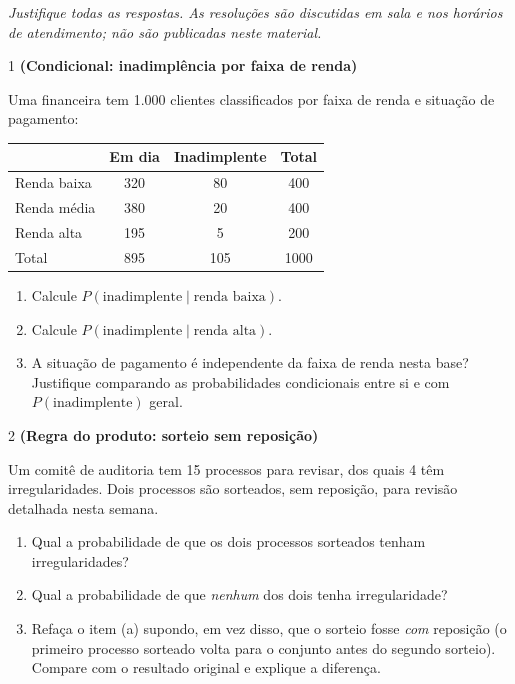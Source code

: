 \documentclass[11pt]{article}
\begin{document}

\noindent \textit{Justifique todas as respostas. As resoluções são discutidas em sala e nos horários de atendimento; não são publicadas neste material.}

\begin{questao}{1} \textbf{(Condicional: inadimplência por faixa de renda)}

Uma financeira tem 1.000 clientes classificados por faixa de renda e situação de pagamento:

\begin{center}
\begin{tabular}{l|cc|c}
\toprule
 & Em dia & Inadimplente & Total \\
\midrule
Renda baixa  & 320 & 80  & 400 \\
Renda média  & 380 & 20  & 400 \\
Renda alta   & 195 & 5   & 200 \\
\midrule
Total        & 895 & 105 & 1000\\
\bottomrule
\end{tabular}
\end{center}

\begin{enumerate}[label=(\alph*)]
  \item Calcule $P(\text{inadimplente}\mid\text{renda baixa})$.
  \item Calcule $P(\text{inadimplente}\mid\text{renda alta})$.
  \item A situação de pagamento é independente da faixa de renda nesta base? Justifique
    comparando as probabilidades condicionais entre si e com $P(\text{inadimplente})$ geral.
\end{enumerate}
\end{questao}

\begin{questao}{2} \textbf{(Regra do produto: sorteio sem reposição)}

Um comitê de auditoria tem 15 processos para revisar, dos quais 4 têm irregularidades. Dois
processos são sorteados, sem reposição, para revisão detalhada nesta semana.

\begin{enumerate}[label=(\alph*)]
  \item Qual a probabilidade de que os dois processos sorteados tenham irregularidades?
  \item Qual a probabilidade de que \emph{nenhum} dos dois tenha irregularidade?
  \item Refaça o item (a) supondo, em vez disso, que o sorteio fosse \emph{com} reposição (o
    primeiro processo sorteado volta para o conjunto antes do segundo sorteio). Compare com o
    resultado original e explique a diferença.
\end{enumerate}
\end{questao}
\end{document}
